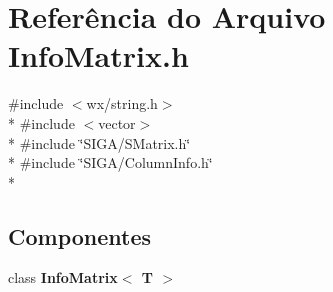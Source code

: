 \section{Referência do Arquivo Info\+Matrix.\+h}
\label{_info_matrix_8h}
{\ttfamily \#include $<$wx/string.\+h$>$}\\*
{\ttfamily \#include $<$vector$>$}\\*
{\ttfamily \#include \char`\"{}S\+I\+G\+A/\+S\+Matrix.\+h\char`\"{}}\\*
{\ttfamily \#include \char`\"{}S\+I\+G\+A/\+Column\+Info.\+h\char`\"{}}\\*
\subsection*{Componentes}
\begin{DoxyCompactItemize}
\item 
class {\bf Info\+Matrix$<$ T $>$}
\end{DoxyCompactItemize}
